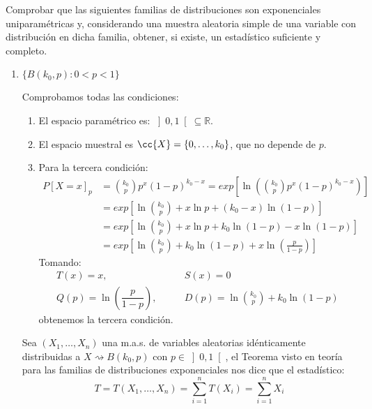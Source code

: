 \begin{ejercicio}
    Comprobar que las siguientes familias de distribuciones son exponenciales uniparamétricas y, considerando una muestra aleatoria simple de una variable con distribución en dicha familia, obtener, si existe, un estadístico suficiente y completo.
    \begin{enumerate}[label=\alph*)]
        \item $\{B(k_0,p) : 0<p<1\}$

            Comprobamos todas las condiciones:
            \begin{enumerate}[label=\arabic*.]
                \item El espacio paramétrico es: $\left]0,1\right[\subseteq \mathbb{R}$.
                \item El espacio muestral es $\cc{X} = \{0,\ldots,k_0\}$, que no depende de $p$.
                \item Para la tercera condición:
                    \begin{align*}
                        P[X=x]_p &= \binom{k_0}{p} p^{x}{(1-p)}^{k_0-x} = exp\left[\ln\left(\binom{k_0}{p}p^{x}{(1-p)}^{k_0-x} \right)\right]\\
                               &= exp\left[\ln\binom{k_0}{p} + x\ln p + (k_0-x)\ln(1-p)\right] \\
                               &= exp\left[\ln\binom{k_0}{p} + x\ln p + k_0 \ln (1-p) - x\ln(1-p)\right] \\
                               &= exp\left[\ln\binom{k_0}{p} + k_0 \ln (1-p) + x\ln\left(\frac{p}{1-p}\right)\right] 
                    \end{align*}
                    Tomando:
                    \begin{align*}
                        T(x) = x, &\qquad S(x) = 0 \\
                        Q(p) = \ln\left(\dfrac{p}{1-p}\right), &\qquad D(p) = \ln\binom{k_0}{p} + k_0\ln(1-p)
                    \end{align*}
                    obtenemos la tercera condición. 
            \end{enumerate}
            Sea $(X_1, \ldots, X_n)$ una m.a.s. de variables aleatorias idénticamente distribuidas a $X\rightsquigarrow B(k_0,p)$ con $p\in \left]0,1\right[$, el Teorema visto en teoría para las familias de distribuciones exponenciales nos dice que el estadístico:
            \begin{equation*}
                T = T(X_1, \ldots, X_n) = \sum_{i=1}^{n}T(X_i) = \sum_{i=1}^{n}X_i

\end{equation*}
\end{enumerate}
\end{ejercicio}
